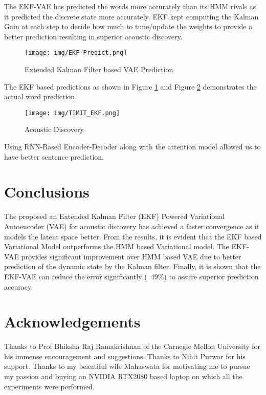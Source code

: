 \documentclass{article}
\begin{document}
The EKF-VAE has predicted the words more accurately than its HMM rivals as it predicted the discrete state more accurately. EKF kept computing the Kalman Gain at each step to decide how much to tune/update the weights to provide a better prediction resulting in superior acoustic discovery. 

\begin{figure}[H]
  \centering
  \texttt{[image: img/EKF-Predict.png]}
  \caption{ Extended Kalman Filter based VAE Prediction}
  \label{fig:fig10}
\end{figure}
The EKF based predictions as shown in Figure \ref{fig:fig10} and Figure \ref{fig:fig11} demonstrates the actual word prediction.
\begin{figure}[H]
  \centering
  \texttt{[image: img/TIMIT\_EKF.png]}
  \caption{Acoustic Discovery}
  \label{fig:fig11}
\end{figure}
Using RNN-Based Encoder-Decoder along with the attention model allowed us to have better sentence prediction. 

\section{Conclusions}
\label{section:conclusions}
The proposed an Extended Kalman Filter (EKF) Powered Variational Autoencoder (VAE) for acoustic discovery has achieved a faster convergence as it models the latent space better. From the results, it is evident that the EKF based Variational Model outperforms the HMM based Variational model. The EKF-VAE provides significant improvement over HMM based VAE due to better prediction of the dynamic state by the Kalman filter. Finally, it is shown that the EKF-VAE can reduce the error significantly (~49\%) to assure superior prediction accuracy.

\section{Acknowledgements}
Thanks to Prof Bhiksha Raj Ramakrishnan of the Carnegie Mellon University for his immense encouragement and suggestions. Thanks to Nihit Purwar for his support. Thanks to my beautiful wife Mahaswata for motivating me to pursue my passion and buying an NVIDIA RTX2080 based laptop on which all the experiments were performed.

\normalsize



\end{document}
